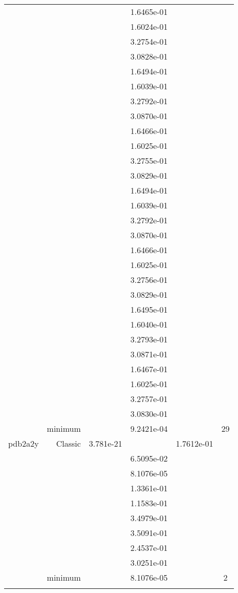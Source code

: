 \begin{xltabular}{\textwidth}{r|rS[table-format=1.3e+2]S[table-format=1.4e+2]S[table-format=1.4e+2]S[table-format=-1.5]}
&  &  & 1.6465e-01 & & \\
&  &  & 1.6024e-01 & & \\
&  &  & 3.2754e-01 & & \\
&  &  & 3.0828e-01 & & \\
&  &  & 1.6494e-01 & & \\
&  &  & 1.6039e-01 & & \\
&  &  & 3.2792e-01 & & \\
&  &  & 3.0870e-01 & & \\
&  &  & 1.6466e-01 & & \\
&  &  & 1.6025e-01 & & \\
&  &  & 3.2755e-01 & & \\
&  &  & 3.0829e-01 & & \\
&  &  & 1.6494e-01 & & \\
&  &  & 1.6039e-01 & & \\
&  &  & 3.2792e-01 & & \\
&  &  & 3.0870e-01 & & \\
&  &  & 1.6466e-01 & & \\
&  &  & 1.6025e-01 & & \\
&  &  & 3.2756e-01 & & \\
&  &  & 3.0829e-01 & & \\
&  &  & 1.6495e-01 & & \\
&  &  & 1.6040e-01 & & \\
&  &  & 3.2793e-01 & & \\
&  &  & 3.0871e-01 & & \\
&  &  & 1.6467e-01 & & \\
&  &  & 1.6025e-01 & & \\
&  &  & 3.2757e-01 & & \\
&  &  & 3.0830e-01 & & \\
& minimum &  & 9.2421e-04 & & 29 \\  \addlinespace
pdb2a2y & Classic & 3.781e-21 &  & 1.7612e-01 & \\
&  &  & 6.5095e-02 & & \\
&  &  & 8.1076e-05 & & \\
&  &  & 1.3361e-01 & & \\
&  &  & 1.1583e-01 & & \\
&  &  & 3.4979e-01 & & \\
&  &  & 3.5091e-01 & & \\
&  &  & 2.4537e-01 & & \\
&  &  & 3.0251e-01 & & \\
& minimum &  & 8.1076e-05 & & 2 \\  \addlinespace

\end{xltabular}

